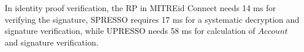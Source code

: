 In identity proof verification, the RP in MITREid Connect needs 14 ms for verifying the signature, SPRESSO requires 17 ms for a systematic decryption and signature verification, while UPRESSO needs 58 ms for calculation of $Account$ and signature verification.

